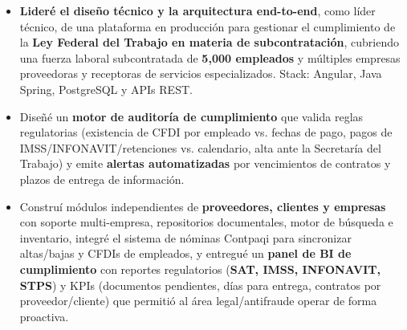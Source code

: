 {
\begin{itemize}
    \item \textbf{Lideré el diseño técnico y la arquitectura end-to-end}, como líder técnico, de una plataforma en producción para gestionar el cumplimiento de la \textbf{Ley Federal del Trabajo en materia de subcontratación}, cubriendo una fuerza laboral subcontratada de \textbf{5{,}000 empleados} y múltiples empresas proveedoras y receptoras de servicios especializados. Stack: Angular, Java Spring, PostgreSQL y APIs REST.
    \item Diseñé un \textbf{motor de auditoría de cumplimiento} que valida reglas regulatorias (existencia de CFDI por empleado vs. fechas de pago, pagos de IMSS/INFONAVIT/retenciones vs. calendario, alta ante la Secretaría del Trabajo) y emite \textbf{alertas automatizadas} por vencimientos de contratos y plazos de entrega de información.
    \item Construí módulos independientes de \textbf{proveedores, clientes y empresas} con soporte multi-empresa, repositorios documentales, motor de búsqueda e inventario, integré el sistema de nóminas Contpaqi para sincronizar altas/bajas y CFDIs de empleados, y entregué un \textbf{panel de BI de cumplimiento} con reportes regulatorios (\textbf{SAT, IMSS, INFONAVIT, STPS}) y KPIs (documentos pendientes, días para entrega, contratos por proveedor/cliente) que permitió al área legal/antifraude operar de forma proactiva.
\end{itemize}
}

